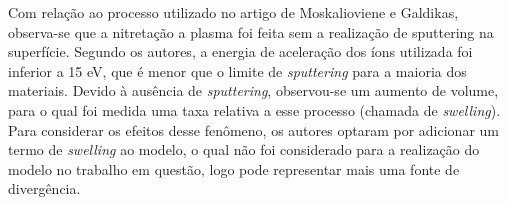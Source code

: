 Com relação ao processo utilizado no artigo de Moskalioviene e Galdikas, observa-se que a nitretação a plasma foi feita sem a realização de sputtering na superfície. Segundo os autores, a energia de aceleração dos íons utilizada foi inferior a 15 eV, que é menor que o limite de \textit{sputtering} para a maioria dos materiais. Devido à ausência de \textit{sputtering}, observou-se um aumento de volume, para o qual foi medida uma taxa relativa a esse processo (chamada de \textit{swelling}). Para considerar os efeitos desse fenômeno, os autores optaram por adicionar um termo de \textit{swelling} ao modelo, o qual não foi considerado para a realização do modelo no trabalho em questão, logo pode representar mais uma fonte de divergência.